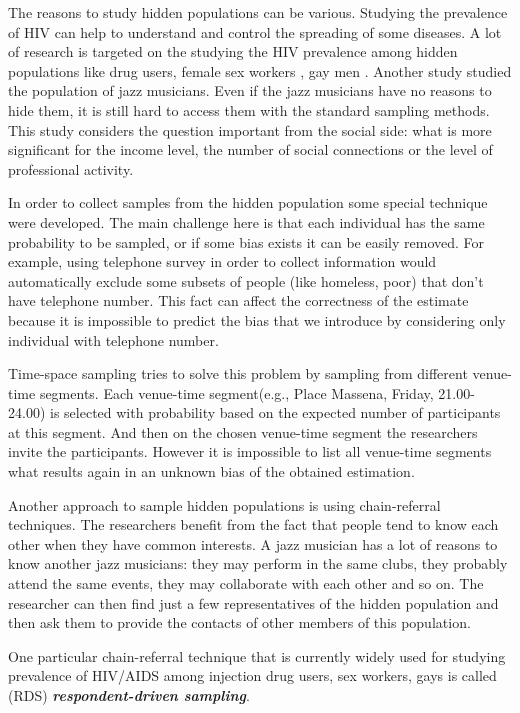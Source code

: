 \documentclass[12pt]{report}
\begin{document}
The reasons to study hidden populations can be various. Studying the prevalence of HIV can help to understand and control the spreading of some diseases. A lot of research is targeted on the studying the HIV prevalence among hidden populations like drug users, female sex workers \cite{musyoki2015prevalence}, gay men \cite{ramirez2005networks}.  Another study \cite{heckathorn2003jazz} studied the population of jazz musicians. Even if the jazz musicians have no reasons to hide them, it is still hard to access them with the standard sampling methods. This study considers the question important from the social side: what is more significant for the income level, the number of social connections or the level of professional activity.

In order to collect samples from the hidden population some special technique were developed. The main challenge here is that each individual has the same probability to be sampled, or if some bias exists it can be easily removed. For example, using telephone survey in order to collect information would automatically exclude some subsets of people (like homeless, poor) that don't have telephone number. This fact can affect the correctness of the estimate because it is impossible to predict the bias that we introduce by considering only individual with telephone number. 

Time-space sampling tries to solve this problem by sampling from different venue-time segments. Each venue-time segment(e.g., Place Massena, Friday, 21.00-24.00) is selected with probability based on the expected number of participants at this segment. And then on the chosen venue-time segment the researchers invite the participants. However it is impossible to list all venue-time segments what results again in an unknown bias of the obtained estimation.

Another approach to sample hidden populations is using chain-referral techniques. The researchers benefit from the fact that people tend to know each other when they have common interests. A jazz musician has a lot of reasons to know another jazz musicians: they may perform in the same clubs, they probably attend the same events, they may collaborate with each other and so on. The researcher can then find just a few representatives of the hidden population and then ask them to provide the contacts of other members of this population.

One particular chain-referral technique that is currently widely used for studying prevalence of HIV/AIDS among injection drug users, sex workers, gays is called (RDS) \textit{\textbf{respondent-driven sampling}}.
\end{document}
